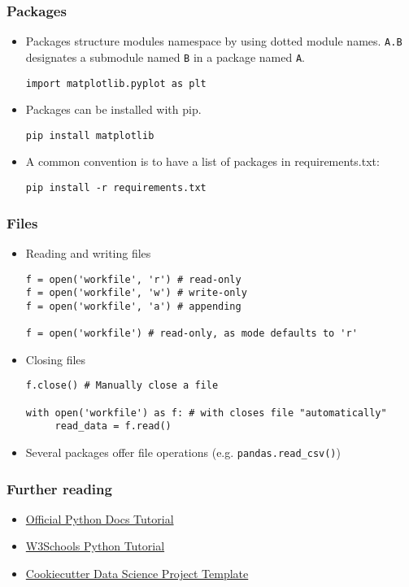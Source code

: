 \begin{frame}
    \frametitle{Packages}
    \begin{itemize}
        \item Packages structure modules namespace by using dotted
        module names. \texttt{A.B} designates a submodule
        named \texttt{B} in a package named
        \texttt{A}.
\begin{verbatim}
import matplotlib.pyplot as plt
\end{verbatim}
        \item Packages can be installed with pip.
\begin{verbatim}
pip install matplotlib
\end{verbatim}
        \item A common convention is to have a list of packages in requirements.txt:
\begin{verbatim}
pip install -r requirements.txt
\end{verbatim}
    \end{itemize}
\end{frame}

\begin{frame}[fragile]
    \frametitle{Files}
    \begin{itemize}
        \item Reading and writing files
\begin{verbatim}
f = open('workfile', 'r') # read-only
f = open('workfile', 'w') # write-only
f = open('workfile', 'a') # appending

f = open('workfile') # read-only, as mode defaults to 'r'
\end{verbatim}
        \item Closing files
\begin{verbatim}
f.close() # Manually close a file

with open('workfile') as f: # with closes file "automatically"
     read_data = f.read()
\end{verbatim}
        \item Several packages offer file operations (e.g.
        \texttt{pandas.read_csv()})
    \end{itemize}
\end{frame}

\begin{frame}
    \frametitle{Further reading}
    \begin{itemize}
        \item \href{https://docs.python.org/3/tutorial/index.html}{Official Python Docs Tutorial}
        \item \href{https://www.w3schools.com/python/}{W3Schools Python Tutorial}
        \item \href{http://drivendata.github.io/cookiecutter-data-science/}{Cookiecutter Data Science Project Template}
    \end{itemize}
\end{frame}
